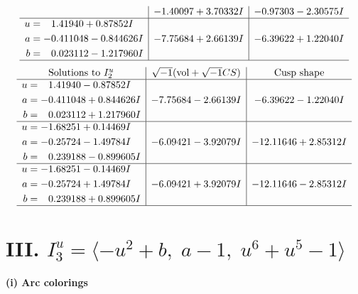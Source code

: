 \documentclass[1p]{elsarticle_modified}
\theoremstyle{definition}
\newcommand{\I}{\sqrt{-1}}
\begin{document}
$$\begin{array}{c|c|c}
 & -1.40097 + 3.70332 I & -0.97303 - 2.30575 I \\ \hline\begin{aligned}
u &= \phantom{-}1.41940 + 0.87852 I \\
a &= -0.411048 - 0.844626 I \\
b &= \phantom{-}0.023112 - 1.217960 I\end{aligned}
 & -7.75684 + 2.66139 I & -6.39622 + 1.22040 I\\
 \hline 
 \end{array}$$\newpage$$\begin{array}{c|c|c}  
\text{Solutions to }I^u_{2}& \I (\text{vol} + \sqrt{-1}CS) & \text{Cusp shape}\\
 \hline 
\begin{aligned}
u &= \phantom{-}1.41940 - 0.87852 I \\
a &= -0.411048 + 0.844626 I \\
b &= \phantom{-}0.023112 + 1.217960 I\end{aligned}
 & -7.75684 - 2.66139 I & -6.39622 - 1.22040 I \\ \hline\begin{aligned}
u &= -1.68251 + 0.14469 I \\
a &= -0.25724 - 1.49784 I \\
b &= \phantom{-}0.239188 - 0.899605 I\end{aligned}
 & -6.09421 - 3.92079 I & -12.11646 + 2.85312 I \\ \hline\begin{aligned}
u &= -1.68251 - 0.14469 I \\
a &= -0.25724 + 1.49784 I \\
b &= \phantom{-}0.239188 + 0.899605 I\end{aligned}
 & -6.09421 + 3.92079 I & -12.11646 - 2.85312 I\\
 \hline 
 \end{array}$$\newpage\newpage\renewcommand{\arraystretch}{1}
\centering \section*{III. $I^u_{3}= \langle - u^2+b,\;a-1,\;u^6+u^5-1 \rangle$}
\flushleft \textbf{(i) Arc colorings}\\
\end{document}
